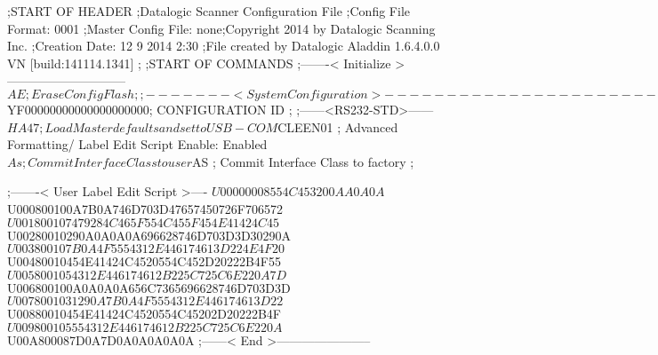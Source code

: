 ;START OF HEADER
;Datalogic Scanner Configuration File
;Config File Format: 0001
;Master Config File: none;Copyright 2014 by Datalogic Scanning Inc.
;Creation Date: 12 9 2014 2:30
;File created by Datalogic Aladdin 1.6.4.0.0 VN [build:141114.1341]
;
;START OF COMMANDS
;-------< Initialize >-----------------------------
$AE                 ; Erase Config Flash
;
;-------< System Configuration >-------------------------------
$YF00000000000000000000; CONFIGURATION ID
;
;------<RS232-STD>------
$HA47               ; Load Master defaults and set to USB-COM
$CLEEN01            ; Advanced Formatting/ Label Edit Script Enable: Enabled
$As                 ; Commit Interface Class to user
$AS                 ; Commit Interface Class to factory
;

;-------< User Label Edit Script >----
$U00000008554C453200AA0A0A
$U000800100A7B0A746D703D47657450726F706572
$U001800107479284C465F554C455F454E41424C45
$U00280010290A0A0A0A696628746D703D3D30290A
$U003800107B0A4F5554312E446174613D224E4F20
$U00480010454E41424C4520554C452D20222B4F55
$U0058001054312E446174612B225C725C6E220A7D
$U006800100A0A0A0A656C7365696628746D703D3D
$U0078001031290A7B0A4F5554312E446174613D22
$U00880010454E41424C4520554C45202D20222B4F
$U009800105554312E446174612B225C725C6E220A
$U00A800087D0A7D0A0A0A0A0A
;------< End >-----------------------
